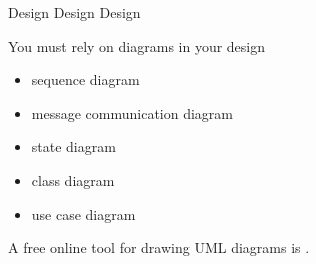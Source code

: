 \documentclass[presentation]{beamer}\mode<presentation>{\usetheme{AMSBolognaFC}}
\begin{document}
\begin{frame}[c,allowframebreaks]{Design Design Design}
    \framebreak
    
    \vfill
    \begin{block}{You must rely on diagrams in your design}
        \begin{itemize}
            \item sequence diagram
            \item message communication diagram
            \item state diagram
            \item class diagram
            \item use case diagram
        \end{itemize}
    \end{block}
    A free online tool for drawing UML diagrams is .

\end{frame}
    
\end{document}
